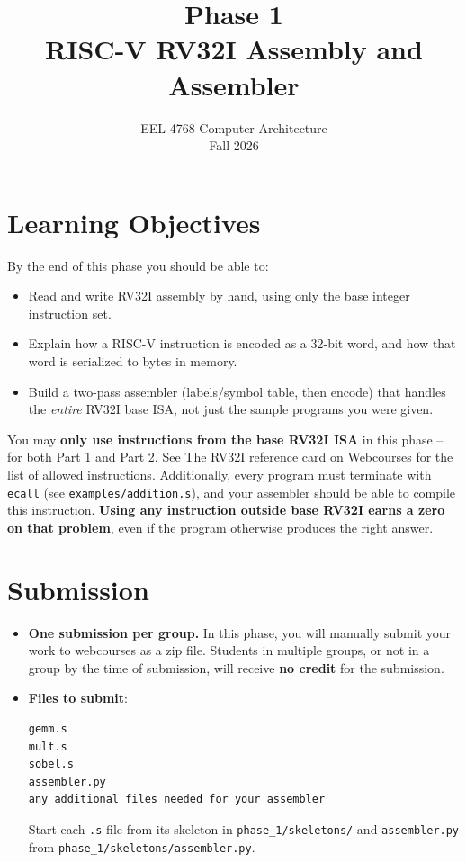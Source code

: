 \documentclass[11pt]{article}
\title{\vspace{-1.5cm}\textbf{Phase 1}\\[2pt]\Large RISC-V RV32I Assembly and Assembler}
\author{EEL 4768 Computer Architecture \\ Fall 2026}
\date{}
\begin{document}
\maketitle
\thispagestyle{fancy}
\vspace{-1cm}

\section*{Learning Objectives}
By the end of this phase you should be able to:
\begin{itemize}
  \item Read and write RV32I assembly by hand, using only the base integer
        instruction set.
  \item Explain how a RISC-V instruction is encoded as a 32-bit word, and
        how that word is serialized to bytes in memory.
  \item Build a two-pass assembler (labels/symbol table, then encode) that
        handles the \emph{entire} RV32I base ISA, not just the sample
        programs you were given.
\end{itemize}

\begin{important}
You may \textbf{only use instructions from the base RV32I ISA} in this phase -- for both Part 1 and Part 2. See The RV32I reference card on
Webcourses for the list of allowed instructions. Additionally, every program must
terminate with \texttt{ecall} (see \texttt{examples/addition.s}), and your assembler should be able to compile this instruction.
\textbf{Using any instruction outside base RV32I earns a zero on that
problem}, even if the program otherwise produces the right answer.
\end{important}

\section{Submission}
\begin{itemize}
\item \textbf{One submission per group.} In this phase, you will manually submit your work to webcourses as a zip file. Students in multiple groups, or not in a group by the time of submission, will receive \textbf{no credit} for the submission.
  \item \textbf{Files to submit}:
\begin{lstlisting}
gemm.s
mult.s
sobel.s
assembler.py
any additional files needed for your assembler
\end{lstlisting}
        Start each \texttt{.s} file from its skeleton in
        \texttt{phase\_1/skeletons/} and \texttt{assembler.py} from
        \texttt{phase\_1/skeletons/assembler.py}.
\end{itemize}
\end{document}
